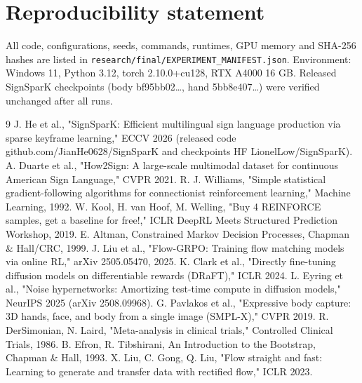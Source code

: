 \documentclass[conference]{IEEEtran}
\begin{document}
\section*{Reproducibility statement}
All code, configurations, seeds, commands, runtimes, GPU memory and SHA-256 hashes are listed in \texttt{research/final/EXPERIMENT\_MANIFEST.json}. Environment: Windows 11, Python 3.12, torch 2.10.0+cu128, RTX A4000 16 GB. Released SignSparK checkpoints (body bf95bb02\ldots{}, hand 5bb8e407\ldots{}) were verified unchanged after all runs.

\begin{thebibliography}{9}
 J. He et al., "SignSparK: Efficient multilingual sign language production via sparse keyframe learning," ECCV 2026 (released code github.com/JianHe0628/SignSparK and checkpoints HF LionelLow/SignSparK).
 A. Duarte et al., "How2Sign: A large-scale multimodal dataset for continuous American Sign Language," CVPR 2021.
 R. J. Williams, "Simple statistical gradient-following algorithms for connectionist reinforcement learning," Machine Learning, 1992.
 W. Kool, H. van Hoof, M. Welling, "Buy 4 REINFORCE samples, get a baseline for free!," ICLR DeepRL Meets Structured Prediction Workshop, 2019.
 E. Altman, Constrained Markov Decision Processes, Chapman \& Hall/CRC, 1999.
 J. Liu et al., "Flow-GRPO: Training flow matching models via online RL," arXiv 2505.05470, 2025.
 K. Clark et al., "Directly fine-tuning diffusion models on differentiable rewards (DRaFT)," ICLR 2024.
 L. Eyring et al., "Noise hypernetworks: Amortizing test-time compute in diffusion models," NeurIPS 2025 (arXiv 2508.09968).
 G. Pavlakos et al., "Expressive body capture: 3D hands, face, and body from a single image (SMPL-X)," CVPR 2019.
 R. DerSimonian, N. Laird, "Meta-analysis in clinical trials," Controlled Clinical Trials, 1986.
 B. Efron, R. Tibshirani, An Introduction to the Bootstrap, Chapman \& Hall, 1993.
 X. Liu, C. Gong, Q. Liu, "Flow straight and fast: Learning to generate and transfer data with rectified flow," ICLR 2023.
\end{thebibliography}
\end{document}
